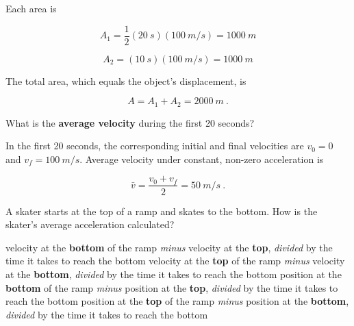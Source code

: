 \documentclass[]{exam}
\theoremstyle{definition}
\begin{document}
\begin{questions}
\begin{solutionorbox}[2.5in]
Each area is

\begin{equation*}
    A_1 = \frac{1}{2}\left(\SI{20}{s}\right)\left(\SI{100}{m/s}\right) = \SI{1000}{m}
\end{equation*}

\begin{equation*}
    A_2 = (\SI{10}{s})(\SI{100}{m/s}) = \SI{1000}{m}
\end{equation*}

The total area, which equals the object's displacement, is

\begin{equation*}
    A = A_1 + A_2 = \SI{2000}{m}\ .
\end{equation*}

\end{solutionorbox}


\question
What is the \textbf{average velocity} during the first 20 seconds?

\begin{solutionorbox}[2.5in]

In the first 20 seconds, the corresponding initial and final velocities are $v_0 = 0$ and $v_f = \SI{100}{m/s}$. Average velocity under constant, non-zero acceleration is

\begin{equation*}
    \bar{v} = \frac{v_0 + v_f}{2} = \SI{50}{m/s}\ .
\end{equation*}

\end{solutionorbox}

\question %
A skater starts at the top of a ramp and skates to the bottom. How is the skater's average acceleration calculated?

\begin{choices}
\CorrectChoice velocity at the \textbf{bottom} of the ramp \textit{minus} velocity at the \textbf{top}, \textit{divided} by the time it takes to reach the bottom
\choice velocity at the \textbf{top} of the ramp \textit{minus} velocity at the \textbf{bottom}, \textit{divided} by the time it takes to reach the bottom
\choice position at the \textbf{bottom} of the ramp \textit{minus} position at the \textbf{top}, \textit{divided} by the time it takes to reach the bottom
\choice position at the \textbf{top} of the ramp \textit{minus} position at the \textbf{bottom}, \textit{divided} by the time it takes to reach the bottom
\end{choices}



\end{questions}
\end{document}

